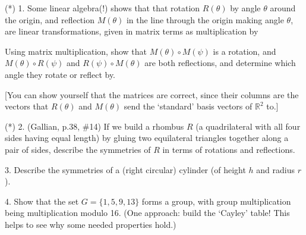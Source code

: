 \documentclass[12pt]{article}
\begin{document}
\begin{description}


\item{(*) 1.} Some linear algebra(!) shows that that rotation $R(\theta)$ by angle $\theta$ 
around the origin, 
and reflection $M(\theta)$ in the line through the origin making angle $\theta$,
are linear transformations, given in matrix terms as multiplication by 

\ssk


\ssk

\item{\spc} Using matrix multiplication, show that $M(\theta)\circ M(\psi)$ is a rotation, and 
$M(\theta)\circ R(\psi)$ and $R(\psi)\circ M(\theta)$ are both reflections, 
and determine which angle they rotate or reflect by.

\ssk

\item{\spc} [You can show yourself that the matrices are correct, since their columns are the vectors that
$R(\theta)$ and $M(\theta)$ send the `standard' basis vectors of $\mathbb{R}^2$ to.]

\msk

\item{(*) 2.} (Gallian, p.38, \#14) If we build a rhombus $R$ (a quadrilateral
with all four sides having equal length) by gluing two equilateral
triangles together along a pair of sides, describe the symmetries
of $R$ in terms of rotations and reflections.

\msk

\item{3.} Describe the symmetries of a (right circular) cylinder (of height $h$ and radius $r$).

\msk

\item{4.} Show that the set $G=\{1,5,9,13\}$ forms a group, with group 
multiplication
being multiplication modulo 16. (One approach: build the `Cayley' table!
This helps to see why some needed properties hold.)


\end{description}
\end{document}
